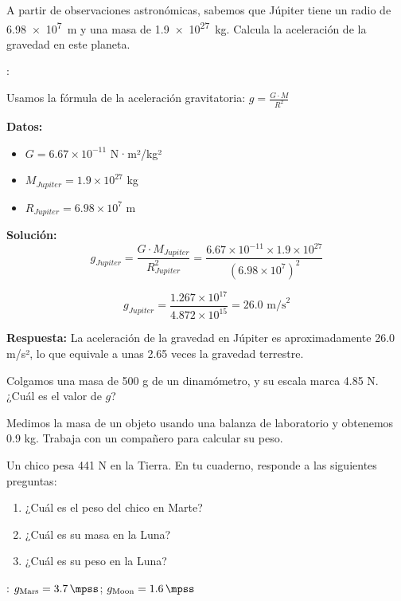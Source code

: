 \begin{exercise}
    A partir de observaciones astronómicas, sabemos que Júpiter tiene un radio de \qty{6.98e7}{\metre} y una masa de \qty{1.9e27}{\kilo\g}.
    Calcula la aceleración de la gravedad en este planeta.

    \datos{}: \Ggravitacion

    \begin{solu}
        Usamos la fórmula de la aceleración gravitatoria: $g = \frac{G \cdot M}{R^2}$

        \textbf{Datos:}
        \begin{itemize}
            \item $G = 6.67 \times 10^{-11}$ N·m²/kg²
            \item $M_{Jupiter} = 1.9 \times 10^{27}$ kg
            \item $R_{Jupiter} = 6.98 \times 10^{7}$ m
        \end{itemize}

        \textbf{Solución:}
        $$g_{Jupiter} = \frac{G \cdot M_{Jupiter}}{R_{Jupiter}^2} = \frac{6.67 \times 10^{-11} \times 1.9 \times 10^{27}}{(6.98 \times 10^7)^2}$$

        $$g_{Jupiter} = \frac{1.267 \times 10^{17}}{4.872 \times 10^{15}} = 26.0\text{ m/s}^2$$

        \textbf{Respuesta:} La aceleración de la gravedad en Júpiter es aproximadamente 26.0 m/s², lo que equivale a unas 2.65 veces la gravedad terrestre.
    \end{solu}
\end{exercise}



\begin{exercise}
    Colgamos una masa de 500 g de un dinamómetro, y su escala marca 4.85 N. ¿Cuál es el valor de \( g \)?
\end{exercise}

\begin{exercise}
    Medimos la masa de un objeto usando una balanza de laboratorio y obtenemos 0.9 kg.
    Trabaja con un compañero para calcular su peso.
\end{exercise}


\begin{exercise}
    Un chico pesa 441 N en la Tierra.
    En tu cuaderno, responde a las siguientes preguntas:
    \begin{enumerate}[label=\alph*)]
\item ¿Cuál es el peso del chico en Marte?
\item ¿Cuál es su masa en la Luna?
\item ¿Cuál es su peso en la Luna?
    \end{enumerate}

    \datos{}: \( g_{\text{Mars}} = \qty{3.7}{\mpss} \); \( g_{\text{Moon}} = \qty{1.6}{\mpss} \)
\end{exercise}


